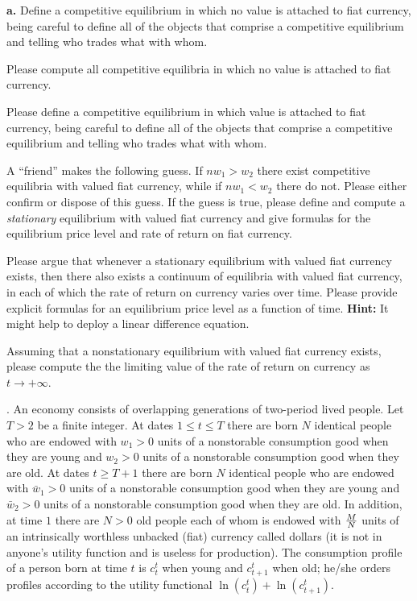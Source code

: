 \medskip
\noindent 
{\bf a.} Define a competitive equilibrium in which no value is attached to fiat currency, being careful to define all
of the objects that comprise a competitive equilibrium and telling who trades what with whom.

\medskip
{} Please compute all competitive equilibria in which no value is attached to fiat currency.

\medskip
{} Please define a competitive equilibrium in which value is attached to fiat currency, 
being careful to define all
of the objects that comprise a competitive equilibrium and telling who trades what with whom.

\medskip
{} A ``friend'' makes the following guess.  If $n w_1 > w_2$ there exist competitive equilibria
with valued fiat currency, while if $n w_1 < w_2$ there do not.  Please either confirm or dispose of this guess.
If the guess is true, please define and compute a {\it stationary\/} equilibrium with valued fiat currency and give formulas
for the equilibrium price level and rate of return on fiat currency.

\medskip
{} Please argue that whenever a stationary equilibrium with valued fiat currency exists, then there
also exists a continuum of equilibria with valued fiat currency, in each of which the rate of return on currency
varies over time.  Please provide explicit formulas for an equilibrium  price level as a function of time.  
{\bf Hint:} It might help to deploy a linear difference equation.

\medskip
{} Assuming that a nonstationary equilibrium with valued fiat currency exists, please compute the
the limiting value of the rate of return on currency as $t \rightarrow + \infty$. 


\medskip

. An economy consists of overlapping generations of two-period lived people.  Let $T > 2$ be a finite 
integer. At dates $1 \leq  t \leq T$ there are born
$N$ identical people who are endowed with $w_1 >0$ units of a nonstorable consumption good when they
are young and $w_2>0 $ units of a nonstorable consumption good when they are old.  
At dates $t \geq T+1$ there are born
$N$ identical people who are endowed with $\bar w_1 >0$ units of a nonstorable consumption good when they
are young and $\bar w_2>0$ units of a nonstorable consumption good when they are old. In addition, at time $1$ there
are $N> 0$ old people each of whom is endowed with ${M \over N}$ units of an intrinsically worthless unbacked (fiat) currency called
dollars (it is not in anyone's utility function and is useless for production). The consumption profile
of a person born at time $t$ is $c_t^t$ when young and $c_{t+1}^t$ when old; he/she orders profiles according to the
utility functional
$ \ln (c_t^t) + \ln (c^t_{t+1}) .$


